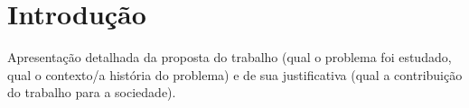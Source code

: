 \section{Introdução}

    Apresentação detalhada da proposta do trabalho (qual o problema foi estudado,
    qual o contexto/a história do problema) e de sua justificativa (qual a
    contribuição do trabalho para a sociedade).